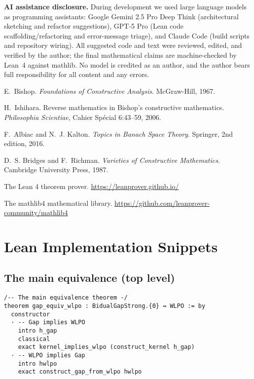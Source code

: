 \documentclass[11pt]{article}  %
\begin{document}
\smallskip
\noindent\textbf{AI assistance disclosure.} During development we used large language models as programming assistants: Google Gemini 2.5 Pro Deep Think (architectural sketching and refactor suggestions), GPT-5 Pro (Lean code scaffolding/refactoring and error-message triage), and Claude Code (build scripts and repository wiring). All suggested code and text were reviewed, edited, and verified by the author; the final mathematical claims are machine-checked by Lean~4 against mathlib. No model is credited as an author, and the author bears full responsibility for all content and any errors.


\begin{thebibliography}{10}

E.~Bishop.
\newblock \emph{Foundations of Constructive Analysis}.
\newblock McGraw-Hill, 1967.

H.~Ishihara.
\newblock Reverse mathematics in Bishop's constructive mathematics.
\newblock \emph{Philosophia Scientiae}, Cahier Sp\'ecial 6:43--59, 2006.

F.~Albiac and N.~J. Kalton.
\newblock \emph{Topics in Banach Space Theory}.
\newblock Springer, 2nd edition, 2016.

D.~S. Bridges and F.~Richman.
\newblock \emph{Varieties of Constructive Mathematics}.
\newblock Cambridge University Press, 1987.

The Lean 4 theorem prover.
\newblock \url{https://leanprover.github.io/}

The mathlib4 mathematical library.
\newblock \url{https://github.com/leanprover-community/mathlib4}

\end{thebibliography}


\appendix

\section{Lean Implementation Snippets}

\subsection{The main equivalence (top level)}

\begin{lstlisting}[caption={Complete bidirectional proof (top level)}]
/-- The main equivalence theorem -/
theorem gap_equiv_wlpo : BidualGapStrong.{0} ↔ WLPO := by
  constructor
  · -- Gap implies WLPO
    intro h_gap
    classical
    exact kernel_implies_wlpo (construct_kernel h_gap)
  · -- WLPO implies Gap
    intro hwlpo
    exact construct_gap_from_wlpo hwlpo
\end{lstlisting}
\end{document}

